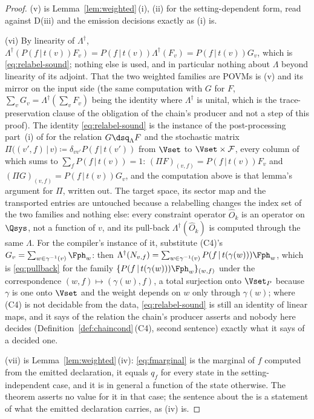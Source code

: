 \begin{proof}
(v) is Lemma~\ref{lem:weighted}\,(i), (ii) for the setting-dependent form,
read against D(iii) and the emission decisions exactly as (i) is.

(vi) By linearity of $\Lambda^{\dagger}$,
$\Lambda^{\dagger}(P(f\,|\,t(v))F_v)=P(f\,|\,t(v))\Lambda^{\dagger}(F_v)
=P(f\,|\,t(v))G_v$, which is \eqref{eq:relabel-sound}; nothing else is used,
and in particular nothing about $\Lambda$ beyond linearity of its adjoint.
That the two weighted families are POVMs is (v) and its mirror on the input
side (the same computation with $G$ for $F$, $\sum_vG_v=\Lambda^{\dagger}
(\sum_vF_v)$ being the identity where $\Lambda^{\dagger}$ is unital, which is
the trace-preservation clause of the obligation of the chain's producer and
not a step of this proof). The identity \eqref{eq:relabel-sound} is the
instance of the post-processing part~(i) of  for
the relation $G\dsq_{\Lambda}F$ and the stochastic matrix
$\Pi\big((v',f)\,|\,v\big)\coloneqq\delta_{vv'}P(f\,|\,t(v'))$ from $\Vset$ to
$\Vset\times\mathcal{F}$, every column of which sums to
$\sum_fP(f\,|\,t(v))=1$: $(\Pi F)_{(v,f)}=P(f\,|\,t(v))F_v$ and
$(\Pi G)_{(v,f)}=P(f\,|\,t(v))G_v$, and the computation above is that
lemma's argument for $\Pi$, written out. The target space, its
sector map and the transported entries are untouched because a relabelling
changes the index set of the two families and nothing else: every constraint
operator $\hat O_k$ is an operator on $\Qsys$, not a function of $v$, and its
pull-back $\Lambda^{\dagger}(\hat O_k)$ is computed through the same
$\Lambda$. For the compiler's instance of it, substitute (C4)'s
$G_v=\sum_{w\in\gamma^{-1}(v)}\Fph_w$: then
$\Lambda^{\dagger}(N_{v,f})=\sum_{w\in\gamma^{-1}(v)}P(f\,|\,t(\gamma(w)))\Fph_w$,
which is \eqref{eq:pullback} for the family
$\{P(f\,|\,t(\gamma(w)))\Fph_w\}_{(w,f)}$ under the correspondence
$(w,f)\mapsto(\gamma(w),f)$, a total surjection onto $\Vset_P$ because
$\gamma$ is one onto $\Vset$ and the weight depends on $w$ only through
$\gamma(w)$; where (C4) is not decidable from the data,
\eqref{eq:relabel-sound} is still an identity of linear maps, and it says of
the relation the chain's producer asserts and nobody here decides
(Definition~\ref{def:chaincond}\,(C4), second sentence) exactly what it says
of a decided one.

(vii) is Lemma~\ref{lem:weighted}\,(iv): \eqref{eq:fmarginal} is the marginal
of $f$ computed from the emitted declaration, it equals $q_f$ for every state
in the setting-independent case, and it is in general a function of the state
otherwise. The theorem asserts no value for it in that case; the sentence
about the  is a statement of what the emitted declaration
carries, as (iv) is.


\end{proof}
